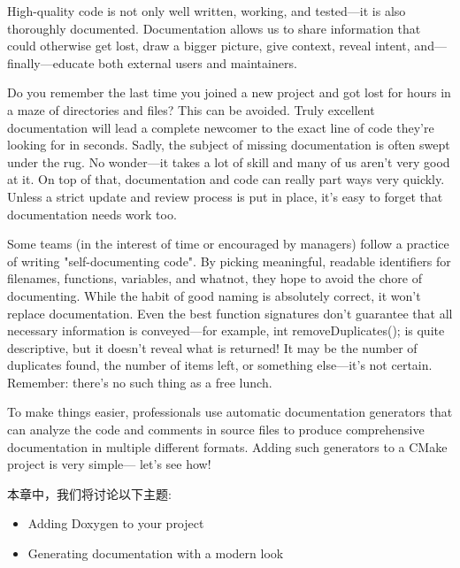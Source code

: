 High-quality code is not only well written, working, and tested—it is also thoroughly documented. Documentation allows us to share information that could otherwise get lost, draw a bigger picture, give context, reveal intent, and—finally—educate both external users and maintainers.

Do you remember the last time you joined a new project and got lost for hours in a maze of directories and files? This can be avoided. Truly excellent documentation will lead a complete newcomer to the exact line of code they're looking for in seconds. Sadly, the subject of missing documentation is often swept under the rug. No wonder—it takes a lot of skill and many of us aren't very good at it. On top of that, documentation and code can really part ways very quickly. Unless a strict update and review process is put in place, it's easy to forget that documentation needs work too.

Some teams (in the interest of time or encouraged by managers) follow a practice of writing "self-documenting code". By picking meaningful, readable identifiers for filenames, functions, variables, and whatnot, they hope to avoid the chore of documenting. While the habit of good naming is absolutely correct, it won't replace documentation. Even the best function signatures don't guarantee that all necessary information is conveyed—for example, int removeDuplicates(); is quite descriptive, but it doesn't reveal what is returned! It may be the number of duplicates found, the number of items left, or something else—it's not certain. Remember: there's no such thing as a free lunch.

To make things easier, professionals use automatic documentation generators that can analyze the code and comments in source files to produce comprehensive documentation in multiple different formats. Adding such generators to a CMake project is very simple— let's see how!

本章中，我们将讨论以下主题:

\begin{itemize}
\item 
Adding Doxygen to your project

\item 
Generating documentation with a modern look
\end{itemize}
